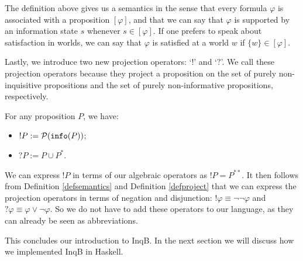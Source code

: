 The definition above gives us a semantics in the sense that every formula $\varphi$ is associated with a proposition $[\varphi]$, and that we can say that $\varphi$ is supported by an information state $s$ whenever $s\in [\varphi]$. If one prefers to speak about satisfaction in worlds, we can say that $\varphi$ is satisfied at a world $w$ if $\{w\}\in [\varphi]$.

Lastly, we introduce two new projection operators: `$!$' and `$?$'. We call these projection operators because they project a proposition on the set of purely non-inquisitive propositions and the set of purely non-informative propositions, respectively.

\begin{defi}\label{defproject}
 For any proposition $P$, we have:
 \begin{itemize}
     \item $!P:= \mathcal{P}(\texttt{info}(P))$;
     \item $?P:= P\cup P^*$.
 \end{itemize}
\end{defi}

We can express $!P$ in terms of our algebraic operators as $!P=P^{**}$. It then follows from Definition \ref{defsemantics} and Definition \ref{defproject} that we can express the projection operators in terms of negation and disjunction: $!\varphi \equiv \neg\neg\varphi$ and $?\varphi\equiv \varphi \lor \neg \varphi$. So we do not have to add these operators to our language, as they can already be seen as abbreviations.

This concludes our introduction to \textsf{InqB}. In the next section we will discuss how we implemented \textsf{InqB} in Haskell. 


